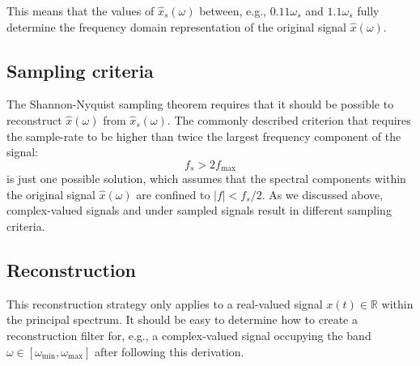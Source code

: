 This means that the values of $\hat{x}_s(\omega)$ between, e.g., $0.11\omega_s$ and $1.1\omega_s$ fully 
determine the frequency domain representation of the original signal $\hat{x}(\omega)$.

\subsection{Sampling criteria}
The Shannon-Nyquist sampling theorem requires that it should be possible to reconstruct $\hat{x}(\omega)$ from
$\hat{x}_s(\omega)$. The commonly described criterion that requires the sample-rate to be higher than twice the 
largest frequency component of the signal:
\begin{equation}
  f_s > 2 f_\mathrm{max}
\end{equation}
is just one possible solution, which assumes that the spectral components within the 
original signal $\hat{x}(\omega)$ are confined to $|f| < f_s/2$. As we discussed above, 
complex-valued signals and under sampled signals result in different sampling criteria.

\subsection{Reconstruction}
This reconstruction strategy only applies to a real-valued signal $x(t) \in \mathbb{R}$ 
within the principal spectrum.
It should be easy to determine how to create a reconstruction filter for, e.g., a 
complex-valued signal occupying the band $\omega \in [\omega_{\mathrm{min}},\omega_{\mathrm{max}}]$ 
after following this derivation.

